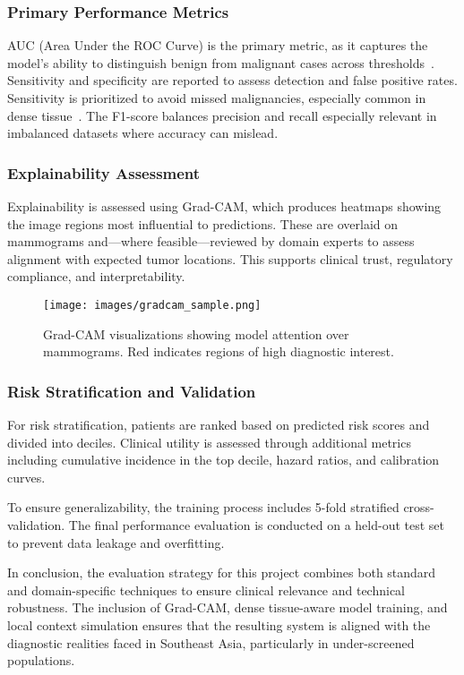 \documentclass[12pt]{article}
\begin{document}
\subsubsection{Primary Performance Metrics}
AUC (Area Under the ROC Curve) is the primary metric, as it captures the model’s ability to distinguish benign from malignant cases across thresholds~\cite{1}. Sensitivity and specificity are reported to assess detection and false positive rates. Sensitivity is prioritized to avoid missed malignancies, especially common in dense tissue~\cite{6}. The F1-score balances precision and recall especially relevant in imbalanced datasets where accuracy can mislead.

\subsubsection{Explainability Assessment}
Explainability is assessed using Grad-CAM, which produces heatmaps showing the image regions most influential to predictions. These are overlaid on mammograms and—where feasible—reviewed by domain experts to assess alignment with expected tumor locations. This supports clinical trust, regulatory compliance, and interpretability.

\begin{figure}[H]
\centering
\texttt{[image: images/gradcam\_sample.png]}
\caption{Grad-CAM visualizations showing model attention over mammograms. Red indicates regions of high diagnostic interest.}
\end{figure}

\subsubsection{Risk Stratification and Validation}
For risk stratification, patients are ranked based on predicted risk scores and divided into deciles. Clinical utility is assessed through additional metrics including cumulative incidence in the top decile, hazard ratios, and calibration curves.

To ensure generalizability, the training process includes 5-fold stratified cross-validation. The final performance evaluation is conducted on a held-out test set to prevent data leakage and overfitting.

In conclusion, the evaluation strategy for this project combines both standard and domain-specific techniques to ensure clinical relevance and technical robustness. The inclusion of Grad-CAM, dense tissue-aware model training, and local context simulation ensures that the resulting system is aligned with the diagnostic realities faced in Southeast Asia, particularly in under-screened populations.
\end{document}
